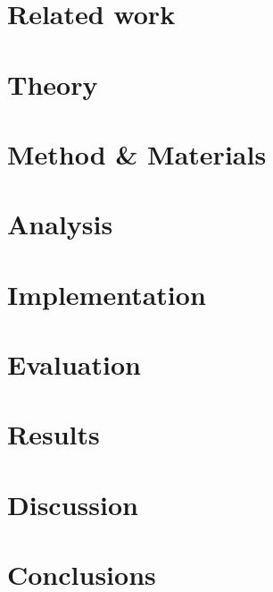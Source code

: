 \documentclass[a4paper,11pt,openany]{kth-mag}
\begin{document}
\chapter{Related work}
     \label{related_work}
\chapter{Theory}
    
\chapter{Method \& Materials}
    
\chapter{Analysis}
    
\chapter{Implementation}
    
    \chapter{Evaluation} \label{evaluation}
    
\chapter{Results}
    
\chapter{Discussion}
    
\chapter{Conclusions}
    
    
\nocite{*}
\printbibliography

\addappheadtotoc



\end{document}
